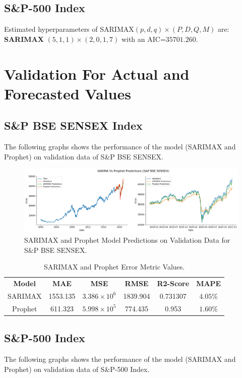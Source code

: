 \documentclass[conference]{IEEEtran}
\begin{document}
\subsection{S\&P-500 Index}
Estimated hyperparameters of SARIMAX$(p, d, q) \times (P, D, Q, M)$ are: \textbf{SARIMAX} $(5, 1, 1) \times (2, 0, 1, 7)$ with an AIC=$35701.260$.

\section{Validation For Actual and Forecasted Values}
\subsection{S\&P BSE SENSEX Index}
The following graphs shows the performance of the model (SARIMAX and Prophet) on validation data of S\&P BSE SENSEX.
\begin{figure}[htbp]
	\centering
	\includegraphics[width = 0.50 \textwidth]{images/SARIMAX-Prophet-SENSEX-Predictions.png}
	\caption{SARIMAX and Prophet Model Predictions on Validation Data for S\&P BSE SENSEX.}
\end{figure}
\begin{table}[htbp]
	\centering
	\caption{SARIMAX and Prophet Error Metric Values.}
	\begin{tabular}{c c c c c c}
		\textbf{Model} & \textbf{MAE} & \textbf{MSE}          & \textbf{RMSE} & \textbf{R2-Score} & \textbf{MAPE} \\
		SARIMAX        & 1553.135     & $3.386 \times 10^{6}$ & 1839.904      & 0.731307          & $4.05 \%$     \\
		Prophet        & 611.323      & $5.998 \times 10^{5}$ & 774.435       & 0.953             & $1.60\%$      \\
	\end{tabular}
\end{table}
\subsection{S\&P-500 Index}
The following graphs shows the performance of the model (SARIMAX and Prophet) on validation data of S\&P-500 Index.
\end{document}

